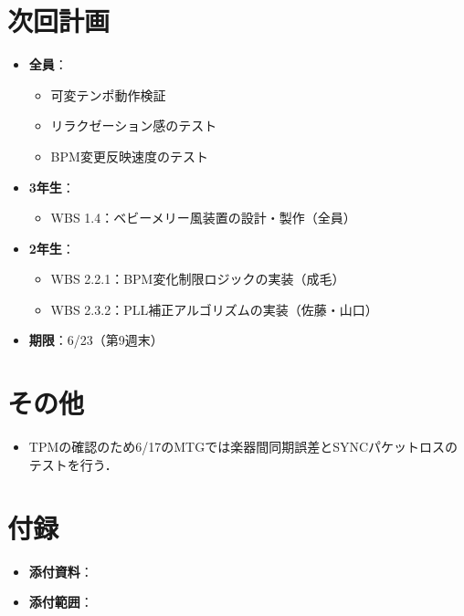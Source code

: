 \documentclass[a4paper,12pt]{ltjsarticle}
\begin{document}
\section{次回計画}

\begin{itemize}
  \item \textbf{全員}：
    \begin{itemize}
      \item 可変テンポ動作検証
      \item リラクゼーション感のテスト
      \item BPM変更反映速度のテスト
    \end{itemize}
  \item \textbf{3年生}：
    \begin{itemize}
      \item WBS 1.4：ベビーメリー風装置の設計・製作（全員）
    \end{itemize}
  \item \textbf{2年生}：
    \begin{itemize}
      \item WBS 2.2.1：BPM変化制限ロジックの実装（成毛）
      \item WBS 2.3.2：PLL補正アルゴリズムの実装（佐藤・山口）
    \end{itemize}
  \item \textbf{期限}：6/23（第9週末）
\end{itemize}

\section{その他}

\begin{itemize}
  \item TPMの確認のため6/17のMTGでは楽器間同期誤差とSYNCパケットロスのテストを行う．
\end{itemize}

\section{付録}

\begin{itemize}
  \item \textbf{添付資料}：
  \item \textbf{添付範囲}：
\end{itemize}
\end{document}
